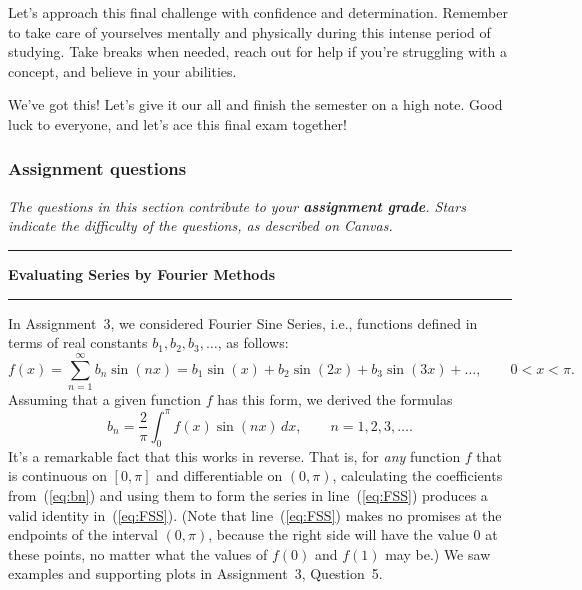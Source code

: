 \documentclass[answers]{exam}
\begin{document}
\begin{questions}
\begin{solution}
        Let's approach this final challenge with confidence and determination. Remember to take care of yourselves mentally and physically during this intense period of studying. Take breaks when needed, reach out for help if you're struggling with a concept, and believe in your abilities.

        We've got this! Let's give it our all and finish the semester on a high note. Good luck to everyone, and let's ace this final exam together!
\end{solution}

\end{questions}
\vfill\clearpage

\subsubsection*{Assignment questions}

\noindent
\textit{The questions in this section contribute to your \textbf{assignment grade}.
Stars indicate the difficulty of the questions, as described on Canvas.}



\bigskip
\goodbreak

\hrule\medskip
\noindent
\textbf{Evaluating Series by Fourier Methods}
\smallskip\hrule\bigskip

\noindent
In Assignment~3, we considered Fourier Sine Series, i.e.,
functions defined in terms of real constants $b_1,b_2,b_3,\ldots$,
as follows:
\begin{equation}\label{eq:FSS}
f(x) 
= \sum_{n=1}^\infty b_n \sin(nx)
= b_1\sin(x) + b_2\sin(2x) + b_3\sin(3x) + \ldots,
\qquad 0<x<\pi.
\end{equation}
Assuming that a given function $f$ has this form,
we derived the formulas
\begin{equation}\label{eq:bn}
b_n = \frac{2}{\pi}\int_0^\pi f(x)\sin(nx)\,dx,\qquad n=1,2,3,\ldots.
\end{equation}
It's a remarkable fact that this works in reverse.
That is, for \emph{any} function $f$ that is continuous
on $[0,\pi]$ and differentiable on $(0,\pi)$,
calculating the coefficients from~(\ref{eq:bn})
and using them to form the series in line~(\ref{eq:FSS})
produces a valid identity in~(\ref{eq:FSS}).
(Note that line~(\ref{eq:FSS}) makes no promises 
at the endpoints of the interval $(0,\pi)$,
because the right side will have the value $0$ at these points,
no matter what the values of $f(0)$ and $f(1)$ may be.)
We saw examples and supporting plots in Assignment~3, Question~5.
\end{document}
